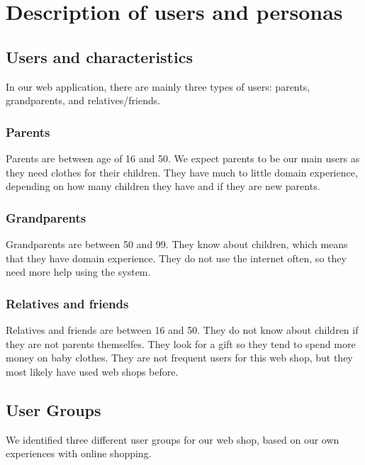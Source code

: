 \section{Description of users and personas}
\subsection{Users and characteristics}

In our web application, there are mainly three types of users: parents,  grandparents, and relatives/friends. 

\subsubsection{Parents}
Parents are between age of 16 and 50. We expect parents to be our main users as they need clothes for their children. They have much to little domain experience, depending on how many children they have and if they are new parents.

\subsubsection{Grandparents}
Grandparents are between 50 and 99. They know about children, which means that they have domain experience.
They do not use the internet often, so they need more help using the system. %
 
\subsubsection{Relatives and friends}
Relatives and friends are between 16 and 50. They do not know about children if they are not parents themselfes. They look for a gift so they tend to spend more money on baby clothes. They are not frequent users for this web shop, but they most likely have used web shops before.

\subsection{User Groups}
We identified three different user groups for our web shop, based on our own experiences with online shopping.
 
